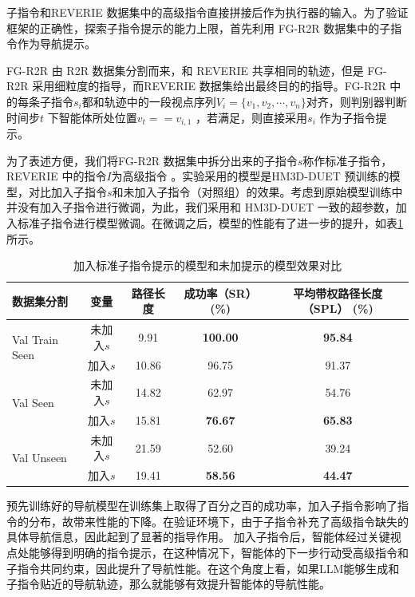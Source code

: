 \documentclass[bachelor]{thesis-uestc}
\begin{document}
子指令和REVERIE 数据集中的高级指令直接拼接后作为执行器的输入。为了验证框架的正确性，探索子指令提示的能力上限，首先利用 FG-R2R 数据集中的子指令作为导航提示。

FG-R2R 由 R2R 数据集分割而来，和 REVERIE 共享相同的轨迹，但是 FG-R2R 采用细粒度的指导，而REVERIE 数据集给出最终目的的指导。FG-R2R 中的每条子指令$s_i$都和轨迹中的一段视点序列$V_i=\{v_1,v_2,\cdots,v_n\}$对齐，则判别器判断时间步$t$ 下智能体所处位置$v_t == v_{i,1}$  ，若满足，则直接采用$s_i$ 作为子指令提示。

为了表述方便，我们将FG-R2R 数据集中拆分出来的子指令$s$称作标准子指令，REVERIE 中的指令$I$为高级指令 。实验采用的模型是HM3D-DUET 预训练的模型，对比加入子指令$s$和未加入子指令（对照组）的效果。考虑到原始模型训练中并没有加入子指令进行微调，为此，我们采用和 HM3D-DUET 一致的超参数，加入标准子指令进行模型微调。在微调之后，模型的性能有了进一步的提升，如表\ref{table:single_column} 所示。


\begin{table}[htbp]
    \centering
    \caption{加入标准子指令提示的模型和未加提示的模型效果对比}
    \label{table:single_column}
    \begin{tabular}{@{}lcccc@{}}
    \toprule
    \textbf{数据集分割} & \textbf{变量} & \textbf{路径长度} & \textbf{成功率（SR） (\%)} & \textbf{平均带权路径长度（SPL） (\%)} \\ \midrule
    \multirow{2}{*}{Val Train Seen} & 未加入$s$ & 9.91 & \textbf{100.00} & \textbf{95.84} \\
                                    & 加入$s$ & 10.86 & 96.75 & 91.37 \\ \midrule
    \multirow{2}{*}{Val Seen}       & 未加入$s$ & 14.82 & 62.97 & 54.76 \\
                                    & 加入$s$ & 15.81 & \textbf{76.67} & \textbf{65.83} \\ \midrule
    \multirow{2}{*}{Val Unseen}     & 未加入$s$ & 21.59 & 52.60 & 39.24 \\
                                    & 加入$s$ & 19.41 & \textbf{58.56} & \textbf{44.47} \\
    \bottomrule
    \end{tabular}
\end{table}

预先训练好的导航模型在训练集上取得了百分之百的成功率，加入子指令影响了指令的分布，故带来性能的下降。在验证环境下，由于子指令补充了高级指令缺失的具体导航信息，因此起到了显著的指导作用。
加入子指令后，智能体经过关键视点处能够得到明确的指令提示，在这种情况下，智能体的下一步行动受高级指令和子指令共同约束，因此提升了导航性能。在这个角度上看，如果LLM能够生成和子指令贴近的导航轨迹，那么就能够有效提升智能体的导航性能。
\end{document}
